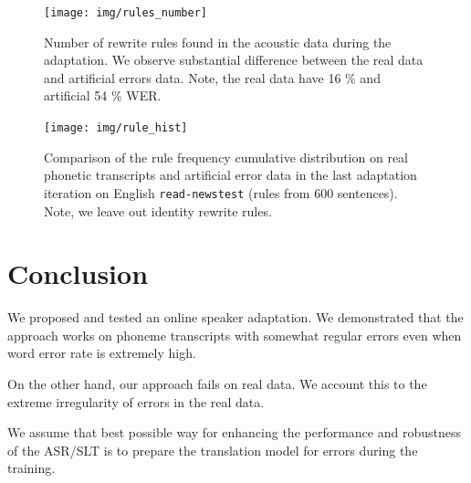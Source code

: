 \begin{figure}[h]
	\texttt{[image: img/rules\_number]}
	\caption{Number of rewrite rules found in the acoustic data during the adaptation. We observe substantial difference between the real data and artificial errors data. Note, the real data have 16 \% and artificial 54 \% WER.}
	\label{fig:rule_number} 
\end{figure}

\begin{figure}[h]
	\texttt{[image: img/rule\_hist]}
	\caption{Comparison of the rule frequency cumulative distribution on real phonetic transcripts and artificial error data in the last adaptation iteration on English \texttt{read-newstest} (rules from 600 sentences). Note, we leave out identity rewrite rules.}
	\label{fig:rule_hist} 
\end{figure}

\section{Conclusion}
We proposed and tested an online speaker adaptation. We demonstrated that the approach works on phoneme transcripts with somewhat regular errors even when word error rate is extremely high. 

On the other hand, our approach fails on real data. We account this to the extreme irregularity of errors in the real data. 

We assume that best possible way for enhancing the performance and robustness of the ASR/SLT is to prepare the translation model for errors during the training. 


